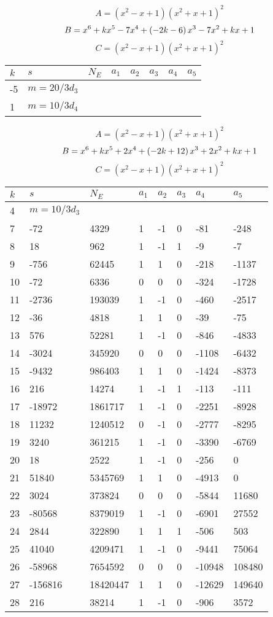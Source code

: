 \documentclass{amsart}
\begin{document}
$$A=(x^2
 - x
 + 1)(x^2
 + x
 + 1)^{2}$$
$$B=x^6
 + k\*x^5
 - 7\*x^4
 + \left(-2\*k
 - 6\right) \*x^3
 - 7\*x^2
 + k\*x
 + 1$$
$$C=(x^2
 - x
 + 1)(x^2
 + x
 + 1)^{2}$$
\begin{longtable}{|l|l|l|lllll|}
\hline
$k$ & $s$ & $N_E$ & $a_1$ & $a_2$ & $a_3$ & $a_4$ & $a_5$\\
\hline
-5&$m=20/3d_{3}$&&\multicolumn{5}{c|}{}\\
1&$m=10/3d_{4}$&&\multicolumn{5}{c|}{}\\
\hline
\end{longtable}
$$A=(x^2
 - x
 + 1)(x^2
 + x
 + 1)^{2}$$
$$B=x^6
 + k\*x^5
 + 2\*x^4
 + \left(-2\*k
 + 12\right) \*x^3
 + 2\*x^2
 + k\*x
 + 1$$
$$C=(x^2
 - x
 + 1)(x^2
 + x
 + 1)^{2}$$
\begin{longtable}{|l|l|l|lllll|}
\hline
$k$ & $s$ & $N_E$ & $a_1$ & $a_2$ & $a_3$ & $a_4$ & $a_5$\\
\hline
4&$m=10/3d_{3}$&&\multicolumn{5}{c|}{}\\
7&-72&4329&1&-1&0&-81&-248\\
8&18&962&1&-1&1&-9&-7\\
9&-756&62445&1&1&0&-218&-1137\\
10&-72&6336&0&0&0&-324&-1728\\
11&-2736&193039&1&-1&0&-460&-2517\\
12&-36&4818&1&1&0&-39&-75\\
13&576&52281&1&-1&0&-846&-4833\\
14&-3024&345920&0&0&0&-1108&-6432\\
15&-9432&986403&1&1&0&-1424&-8373\\
16&216&14274&1&-1&1&-113&-111\\
17&-18972&1861717&1&-1&0&-2251&-8928\\
18&11232&1240512&0&-1&0&-2777&-8295\\
19&3240&361215&1&-1&0&-3390&-6769\\
20&18&2522&1&-1&0&-256&0\\
21&51840&5345769&1&1&0&-4913&0\\
22&3024&373824&0&0&0&-5844&11680\\
23&-80568&8379019&1&-1&0&-6901&27552\\
24&2844&322890&1&1&1&-506&503\\
25&41040&4209471&1&-1&0&-9441&75064\\
26&-58968&7654592&0&0&0&-10948&108480\\
27&-156816&18420447&1&1&0&-12629&149640\\
28&216&38214&1&-1&0&-906&3572\\

\end{longtable}
\end{document}

